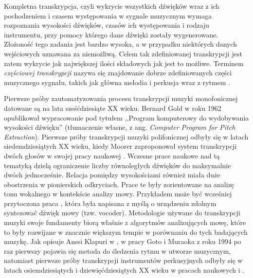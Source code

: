 \documentclass[12pt,a4paper,twoside]{mwart}
\begin{document}
Kompletna transkrypcja, czyli wykrycie wszystkich dźwięków wraz z ich pochodzeniem i czasem występowania w sygnale muzycznym wymaga rozpoznania wysokości dźwięków, czasów ich występowania i rodzaju instrumentu, przy pomocy którego dane dźwięki zostały wygenerowane. Złożoność tego zadania jest bardzo wysoka, a w przypadku niektórych danych wejściowych uznawana za niemożliwą. Celem tak zdefiniowanej transkrypcji jest zatem wykrycie jak największej ilości składowych jak jest to możliwe. Terminem \textit{częściowej transkrypcji} nazywa się znajdowanie dobrze zdefiniowanych części muzycznego sygnału, takich jak główna melodia i perkusja wraz z rytmem 
\cite[3-7]{Transcription:Anssi:SignalProcessingMethods}.

Pierwsze próby zautomatyzowania procesu transkrypcji muzyki monofonicznej datowane są na lata sześćdziesiąte XX wieku. Bernard Gold w roku 1962 opublikował wypracowanie pod tytułem ,,Program komputerowy do wydobywania wysokości dźwięku'' \cite{Transcription:Gold:ComputerProgramForPitchExtraction} (tłumaczenie własne, z ang. \textit{Computer Program for Pitch Extraction}). Pierwsze próby transkrypcji muzyki polifonicznej odbyły się w latach siedemdziesiątych XX wieku, kiedy Moorer zaproponował system transkrypcji dwóch głosów w swojej pracy naukowej \cite{Transcription:Moorer:OnTheTranscriptionOfMusicalSOundByComputer}. Wczesne prace naukowe nad tą tematyką dzielą ograniczenie liczby równoległych dźwięków do maksymalnie dwóch jednocześnie. Relacja pomiędzy wysokościami również miała duże obostrzenia w pionierskich odkryciach. Prace te były zorientowane na analizę tonu wokalnego w kontekście analizy mowy. Przykładem może być wcześniej przytoczona praca \cite{Transcription:Gold:ComputerProgramForPitchExtraction}, która była napisana z myślą o urządzeniu zdolnym syntezować dźwięk mowy (tzw. vocoder). Metodologie używane do transkrypcji muzyki swoje fundamenty biorą właśnie z algorytmów analizujących mowę, które to były rozwijane w znacznie większym tempie w porównaniu do tych badających muzykę. Jak opisuje Anssi Klapuri w 
\cite[6]{Transcription:Anssi:SignalProcessingMethods},
w pracy Goto i Muraoka z roku 1994 \cite{Transcription::FirstRythm} po raz pierwszy pojawia się metoda do śledzenia rytmu w utworze muzycznym, natomiast pierwsze próby transkrypcji instrumentów perkusyjnych odbyły się w latach osiemdziesiątych i dziewięćdziesiątych XX wieku w pracach naukowych 
\cite[99-104]{Transcription:Schloss:AutomaticTranscriptionOfPercussiveMusic} 
i
\cite[77-84]{Transcription:Bilmes:TimingIsOfTHeEssence}.
\end{document}

